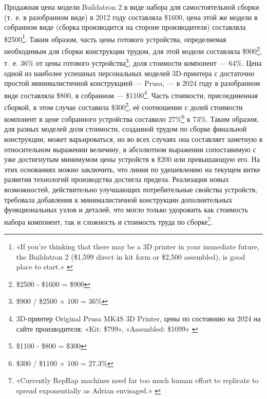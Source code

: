 \documentclass{article}
\begin{document}
Продажная цена модели Buildatron 2 в виде набора для самостоятельной сборки (т.~е. в разобранном виде) в 2012 году составляла \$1600, цена этой же модели в собранном виде (сборка производится на стороне производителя) составляла \$2500\footnote{«If you're thinking that there may be a 3D printer in your immediate future, the Buildatron 2 (\$1,599 direct in kit form or \$2,500 assembled), is good place to start.» \cite{pcmagBuildatron2012}}. Таким образом, часть цены готового устройства, определяемая необходимым для сборки конструкции трудом, для этой модели составляла \$900\footnote{\$2500 - \$1600 = \$900}, т.~е. 36\% от цены готового устройства\footnote{\$900 / \$2500 × 100 = 36\%}, доля стоимости компонент — 64\%. Цена одной из наиболее успешных персональных моделей 3D-принтера с достаточно простой минималистичной конструкцией — Prusa, — в 2024 году в разобранном виде составляла \$800, в собранном — \$1100\footnote{3D-принтер Original Prusa MK4S 3D Printer, цены по состоянию на 2024 на сайте производителя: «Kit: \$799», «Assembled: \$1099» \cite{prusa2024}}. Часть стоимости, присоединенная сборкой, в этом случае составила \$300\footnote{\$1100 - \$800 = \$300}, её соотношение с долей стоимости компонент в цене собранного устройства составило 27\%\footnote{\$300 / \$1100 × 100 = 27.3\%} к 73\%. Таким образом, для разных моделей доля стоимости, созданной трудом по сборке финальной конструкции, может варьироваться, но во всех случаях она составляет заметную в относительном выражении величину, в абсолютном выражении сопоставимую с уже достигнутым минимумом цены устройств в \$200 или превышающую его. На этих основаниях можно заключить, что линия по удешевлению на текущем витке развития технологий производства достигла предела. Реализация новых возможностей, действительно улучшающих потребительные свойства устройств, требовала добавления к минималистичной конструкции дополнительных функциональных узлов и деталей, что могло только удорожить как стоимость набора компонент, так и сложность и стоимость труда по сборке\footnote{«Currently RepRap machines need far too much human effort to replicate to spread exponentially as Adrian envisaged.» \cite{rrAnniversaryIntervieChrisPalmer2018}}.
\end{document}
